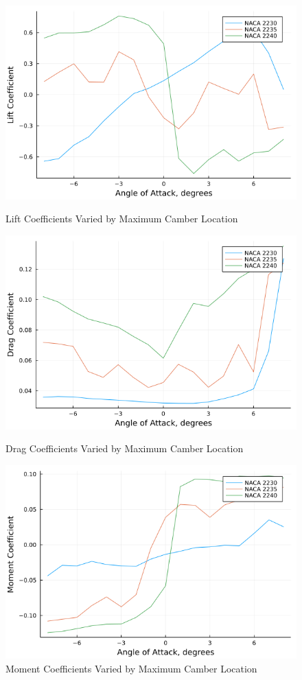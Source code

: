 \documentclass{article}
\begin{document}
\begin{figure}[!htb]
  \includegraphics[width=\linewidth]{Figure13.png}
  \caption{Lift Coefficients Varied by Maximum Camber Location}\label{fig:13}
\endminipage\hfill
{}
  \includegraphics[width=\linewidth]{Figure14.png}
  \caption{Drag Coefficients Varied by Maximum Camber Location}\label{fig:14}
\endminipage\hfill
{}
  \includegraphics[width=\linewidth]{Figure15.png}
  \caption{Moment Coefficients Varied by Maximum Camber Location}\label{fig:15}
\endminipage
\end{figure}
\end{document}
